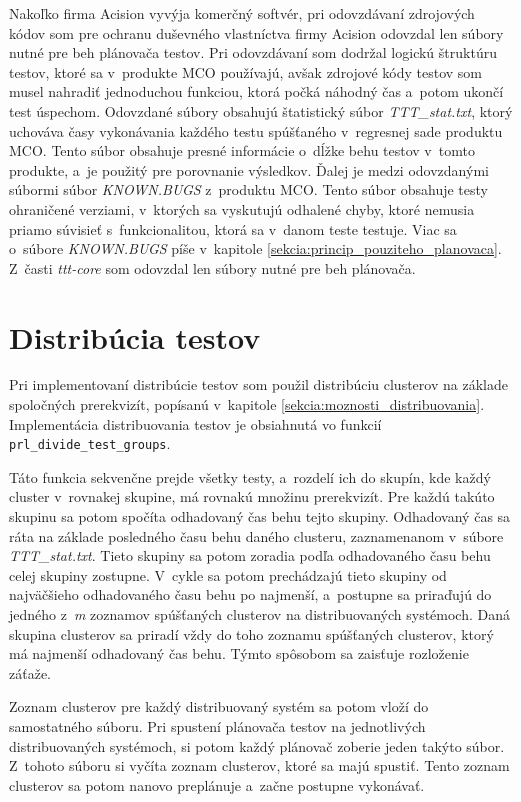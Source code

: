 Nakoľko firma Acision vyvýja komerčný softvér, pri odovzdávaní zdrojových kódov 
som pre ochranu duševného vlastníctva firmy Acision odovzdal len súbory nutné pre 
beh plánovača testov. Pri odovzdávaní som dodržal logickú štruktúru testov, ktoré sa
v~produkte MCO používajú, avšak zdrojové kódy testov som musel nahradiť jednoduchou funkciou,
ktorá počká náhodný čas a~potom ukončí test úspechom.
Odovzdané súbory obsahujú štatistický súbor \textit{TTT\_stat.txt}, ktorý uchováva časy vykonávania
každého testu spúšťaného v~regresnej sade produktu MCO. Tento súbor obsahuje presné informácie o~dĺžke
behu testov v~tomto produkte, a~je použitý pre porovnanie výsledkov.
Ďalej je medzi odovzdanými súbormi súbor \textit{KNOWN.BUGS} z~produktu MCO. Tento súbor obsahuje testy
ohraničené verziami, v~ktorých sa vyskutujú odhalené chyby, ktoré nemusia priamo súvisieť
s~funkcionalitou, ktorá sa v~danom teste testuje. Viac sa o~súbore \textit{KNOWN.BUGS} píše v~kapitole \ref{sekcia:princip_pouziteho_planovaca}.
Z~časti \textit{ttt-core} som odovzdal len súbory nutné pre beh plánovača. 

\section{Distribúcia testov}
\label{sekcia:distribucia_testov}
Pri implementovaní distribúcie testov som použil distribúciu clusterov na základe spoločných prerekvizít, 
popísanú v~kapitole \ref{sekcia:moznosti_distribuovania}.
Implementácia distribuovania testov je obsiahnutá vo funkcií \texttt{prl\_divide\_test\_groups}.

Táto funkcia sekvenčne prejde všetky testy, a~rozdelí ich do skupín, kde každý cluster v~rovnakej skupine,
má rovnakú množinu prerekvizít. Pre každú takúto skupinu sa potom spočíta odhadovaný čas behu tejto skupiny.
Odhadovaný čas sa ráta na základe posledného času behu daného clusteru, zaznamenanom v~súbore \textit{TTT\_stat.txt}.
Tieto skupiny sa potom zoradia podľa odhadovaného času behu celej skupiny zostupne.
V~cykle sa potom prechádzajú tieto skupiny od najväčšieho odhadovaného času behu po najmenší, a~postupne sa priraďujú 
do jedného z~\emph{m} zoznamov spúšťaných clusterov na distribuovaných systémoch.
Daná skupina clusterov sa priradí vždy do toho zoznamu spúšťaných clusterov, ktorý má
najmenší odhadovaný čas behu. Týmto spôsobom sa zaisťuje rozloženie záťaže. 

Zoznam clusterov pre každý distribuovaný systém sa potom vloží do samostatného súboru.
Pri spustení plánovača testov na jednotlivých distribuovaných systémoch, si potom každý
plánovač zoberie jeden takýto súbor. Z~tohoto súboru si vyčíta zoznam clusterov,
ktoré sa majú spustiť. Tento zoznam clusterov sa potom nanovo preplánuje a~začne 
postupne vykonávať.

